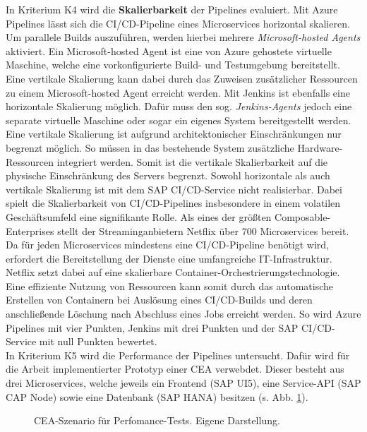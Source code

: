 In Kriterium K4 wird die \textbf{Skalierbarkeit} der Pipelines evaluiert. Mit Azure Pipelines lässt sich die CI/CD-Pipeline eines Microservices horizontal skalieren. Um parallele Builds auszuführen, werden hierbei mehrere \textit{Microsoft-hosted Agents} aktiviert. Ein Microsoft-hosted Agent ist eine von Azure gehostete virtuelle Maschine, welche eine vorkonfigurierte Build- und Testumgebung bereitstellt. Eine vertikale Skalierung kann dabei durch das Zuweisen zusätzlicher Ressourcen zu einem Microsoft-hosted Agent erreicht werden. Mit Jenkins ist ebenfalls eine horizontale Skalierung möglich. Dafür muss den sog. \textit{Jenkins-Agents} jedoch eine separate virtuelle Maschine oder sogar ein eigenes System bereitgestellt werden. Eine vertikale Skalierung ist aufgrund architektonischer Einschränkungen nur begrenzt möglich. So müssen in das bestehende System zusätzliche Hardware-Ressourcen integriert werden. Somit ist die vertikale Skalierbarkeit auf die physische Einschränkung des Servers begrenzt. Sowohl horizontale als auch vertikale Skalierung ist mit dem SAP CI/CD-Service nicht realisierbar. Dabei spielt die Skalierbarkeit von CI/CD-Pipelines insbesondere in einem volatilen Geschäftsumfeld eine signifikante Rolle. Als eines der größten Composable-Enterprises stellt der Streaminganbietern Netflix über 700 Microservices bereit. Da für jeden Microservices mindestens eine CI/CD-Pipeline benötigt wird, erfordert die  Bereitstellung der Dienste eine umfangreiche IT-Infrastruktur. Netflix setzt dabei auf eine skalierbare Container-Orchestrierungstechnologie. Eine effiziente Nutzung von Ressourcen kann somit durch das automatische Erstellen von Containern bei Auslösung eines CI/CD-Builds und deren anschließende Löschung nach Abschluss eines Jobs erreicht werden. So wird Azure Pipelines mit vier Punkten, Jenkins mit drei Punkten und der SAP CI/CD-Service mit null Punkten bewertet.\\ 
In Kriterium K5 wird die Performance der Pipelines untersucht.
Dafür wird für die Arbeit implementierter Prototyp einer CEA verwebdet. Dieser besteht aus drei Microservices, welche jeweils ein Frontend (SAP UI5), eine Service-API (SAP CAP Node) sowie eine Datenbank (SAP HANA) besitzen (s. Abb. \ref{fig:Szenario}). 
\begin{center}
	\begin{figure}[H]
		\centering
		\caption[CEA-Szenario für Perfomance-Tests]{CEA-Szenario für Perfomance-Tests. Eigene Darstellung.}
		\label{fig:Szenario}
	\end{figure}
\end{center}
